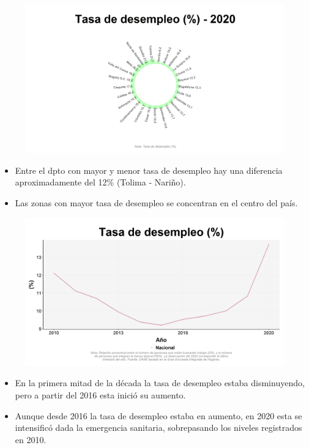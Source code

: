     \begin{figure}[H]
        \caption[Tasa de desempleo por departamentos para 2020 ]{\label{desemp_dpto_static} }
        \begin{center}
        \includegraphics[width=\textwidth,keepaspectratio]{img/var_47_static.png}
        \end{center}
    \end{figure}
            \begin{itemize}
                \item Entre el dpto con mayor y menor tasa de desempleo hay una diferencia aproximadamente del 12\% (Tolima - Nariño).
                \item Las zonas con mayor tasa de desempleo se concentran en el centro del país.
                \end{itemize}

    \begin{figure}[H]
        \caption[Tasa de desempleo a nivel nacional ]{\label{desemp_nal_trend} }
        \begin{center}
        \includegraphics[width=\textwidth,keepaspectratio]{img/var_50_trend.png}
        \end{center}
    \end{figure}
            \begin{itemize}
                \item En la primera mitad de la década la tasa de desempleo estaba disminuyendo, pero a partir del 2016 esta inició su aumento.
                \item Aunque desde 2016 la tasa de desempleo estaba en aumento, en 2020 esta se intensificó dada la emergencia sanitaria, sobrepasando los niveles registrados en 2010.
                \end{itemize}

